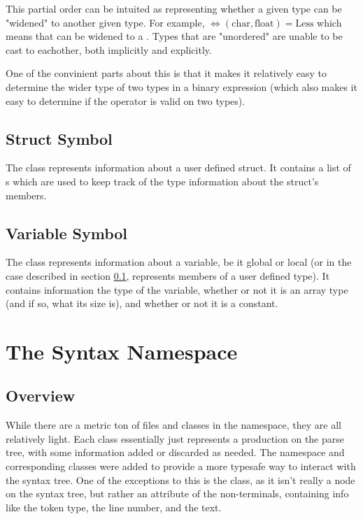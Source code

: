 \documentclass{article}
\begin{document}
This partial order can be intuited as representing whether a given type can be "widened" to another given type.
For example, $\Leftrightarrow (\text{char}, \text{float}) = \text{Less}$ which means that  can be widened to a .
Types that are "unordered" are unable to be cast to eachother, both implicitly and explicitly.

One of the convinient parts about this is that it makes it relatively easy to determine the wider type of two types in a binary expression (which also makes it easy to determine if the operator is valid on two types).

\subsection{Struct Symbol}
\label{symbol:structsymbol}
The  class represents information about a user defined struct.
It contains a list of s which are used to keep track of the type information about the struct's members.

\subsection{Variable Symbol}
\label{symbol:variablesymbol}
The  class represents information about a variable, be it global or local (or in the case described in section \ref{symbol:structsymbol}, represents members of a user defined type).
It contains information the type of the variable, whether or not it is an array type (and if so, what its size is), and whether or not it is a constant.



\section{The Syntax Namespace}
\label{syntax:namespace}

\subsection{Overview}
\label{syntax:overview}
While there are a metric ton of files and classes in the  namespace, they are all relatively light.
Each class essentially just represents a production on the parse tree, with some information added or discarded as needed.
The  namespace and corresponding classes were added to provide a more typesafe way to interact with the syntax tree.
One of the exceptions to this is the  class, as it isn't really a node on the syntax tree, but rather an attribute of the non-terminals, containing info like the token type, the line number, and the text.
\end{document}
